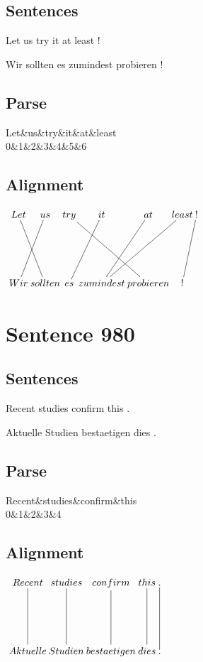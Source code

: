 \documentclass{report}
\begin{document}
\subsection*{Sentences}
Let us try it at least !

\noindent Wir sollten es zumindest probieren !



\subsection*{Parse}
\begin{dependency}[theme=simple]
\begin{deptext}[column sep=.5cm, row sep=.1ex]
Let\&us\&try\&it\&at\&least\\
0\&1\&2\&3\&4\&5\&6\\
\end{deptext}
\end{dependency}


\subsection*{Alignment}
\scriptsize{
$
\xymatrix@C-2.3pc{
Let \ar @{-} [ddr] & us \ar @{-} [ddl] & try \ar @{-} [ddrr] & it \ar @{-} [ddl] & at \ar @{-} [ddl] & least \ar @{-} [ddll] & ! \ar @{-} [ddl]\\\\
Wir & sollten & es & zumindest & probieren & !
}$}
\newpage\section*{Sentence 980}

\subsection*{Sentences}
Recent studies confirm this .

\noindent Aktuelle Studien bestaetigen dies .



\subsection*{Parse}
\begin{dependency}[theme=simple]
\begin{deptext}[column sep=.5cm, row sep=.1ex]
Recent\&studies\&confirm\&this\\
0\&1\&2\&3\&4\\
\end{deptext}
\end{dependency}


\subsection*{Alignment}
\scriptsize{
$
\xymatrix@C-2.3pc{
Recent \ar @{-} [dd] & studies \ar @{-} [dd] & confirm \ar @{-} [dd] & this \ar @{-} [dd] & . \ar @{-} [dd]\\\\
Aktuelle & Studien & bestaetigen & dies & .
}$}
\newpage
\end{document}
